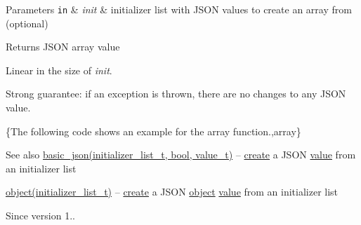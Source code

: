 \begin{DoxyParams}[1]{Parameters}
\mbox{\tt in}  & {\em init} & initializer list with J\+S\+ON values to create an array from (optional)\\
\hline
\end{DoxyParams}
\begin{DoxyReturn}{Returns}
J\+S\+ON array value
\end{DoxyReturn}
Linear in the size of {\itshape init}.

Strong guarantee\+: if an exception is thrown, there are no changes to any J\+S\+ON value.

\{The following code shows an example for the {\ttfamily array} function.,array\}

\begin{DoxySeeAlso}{See also}
\hyperlink{classnlohmann_1_1basic__json_ab5dfd9a2b2663b219641cb7fe59b6da2}{basic\+\_\+json(initializer\+\_\+list\+\_\+t, bool, value\+\_\+t)} -- \hyperlink{classnlohmann_1_1basic__json_a39c5d800f9ceb5912648ddce4e9326ce}{create} a J\+S\+ON \hyperlink{classnlohmann_1_1basic__json_a404017aa52714a0a4bc79d5af7e4ad2b}{value} from an initializer list 

\hyperlink{classnlohmann_1_1basic__json_a31f84ee15c4690ff705bed74736d04c6}{object(initializer\+\_\+list\+\_\+t)} -- \hyperlink{classnlohmann_1_1basic__json_a39c5d800f9ceb5912648ddce4e9326ce}{create} a J\+S\+ON \hyperlink{classnlohmann_1_1basic__json_a31f84ee15c4690ff705bed74736d04c6}{object} \hyperlink{classnlohmann_1_1basic__json_a404017aa52714a0a4bc79d5af7e4ad2b}{value} from an initializer list
\end{DoxySeeAlso}
\begin{DoxySince}{Since}
version 1.. 
\end{DoxySince}

